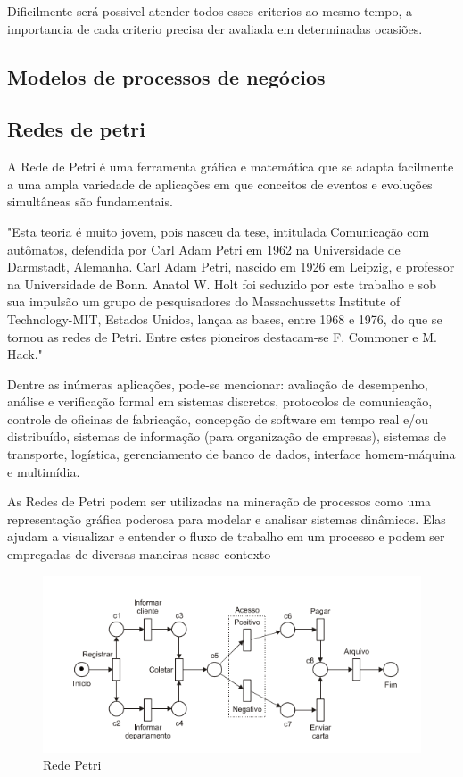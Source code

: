 \documentclass[tcc2]{classe_uftex/uftex}
\begin{document}
\vspace{1cm}

Dificilmente será possivel atender todos esses criterios ao mesmo tempo, a importancia de cada criterio precisa der avaliada em determinadas ocasiões.


\subsection{Modelos de processos de negócios}

\subsection{Redes de petri}

A Rede de Petri é uma ferramenta gráfica e matemática que se adapta facilmente a uma ampla variedade de aplicações em que conceitos de eventos e evoluções simultâneas são fundamentais.\cite{cardoso1997redes}

"Esta teoria é muito jovem, pois nasceu da tese, intitulada Comunicação com autômatos,
defendida por Carl Adam Petri em 1962 na Universidade de Darmstadt, Alemanha. Carl
Adam Petri, nascido em 1926 em Leipzig, e professor na Universidade de Bonn. Anatol
W. Holt foi seduzido por este trabalho e sob sua impulsão um grupo de pesquisadores
do Massachussetts Institute of Technology-MIT, Estados Unidos, lançaa as bases, entre
1968 e 1976, do que se tornou as redes de Petri. Entre estes pioneiros destacam-se F.
Commoner e M. Hack."\cite{cardoso1997redes}

Dentre as inúmeras aplicações, pode-se mencionar: avaliação de desempenho, análise e verificação formal em sistemas discretos, protocolos de comunicação, controle de oficinas de fabricação, concepção de software em tempo real e/ou distribuído, sistemas de informação (para organização de empresas), sistemas de transporte, logística, gerenciamento de banco de dados, interface homem-máquina e multimídia.

As Redes de Petri podem ser utilizadas na mineração de processos como uma representação gráfica poderosa para modelar e analisar sistemas dinâmicos. Elas ajudam a visualizar e entender o fluxo de trabalho em um processo e podem ser empregadas de diversas maneiras nesse contexto



\begin{figure}[h]
    \centering
    \includegraphics[width=12cm]{tcc_example/rede_petri.png}
    \caption{Rede Petri\cite{cardoso1997redes}}
\end{figure}
\end{document}
